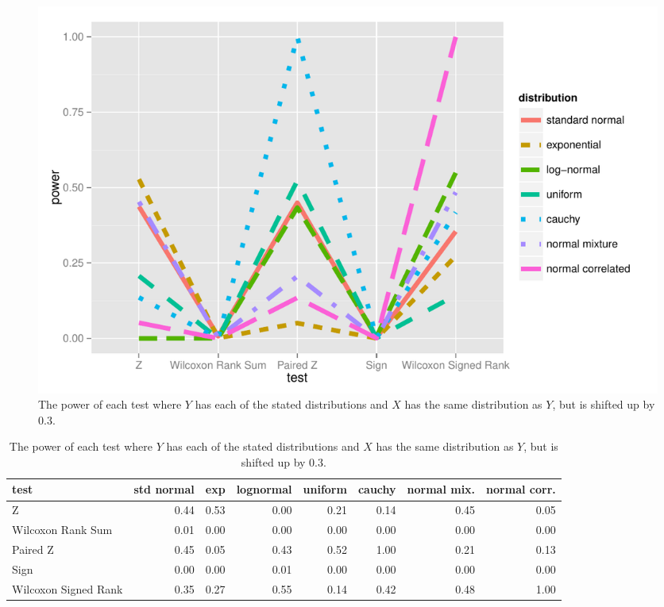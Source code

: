 \documentclass[11pt]{article}
\begin{document}
\begin{figure}[H]
\centering
\includegraphics[scale = 0.8]{part2.pdf}
\caption{The power of each test where $Y$ has each of the stated distributions and $X$ has the same distribution as $Y$, but is shifted up by 0.3.}
\label{fig:part2}
\end{figure}


\begin{table}[ht]
\centering
\begin{tabular}{lrrrrrrr}
  \hline
 test & std normal & exp & lognormal & uniform & cauchy & normal mix. & normal corr. \\ 
  \hline
Z & 0.44 & 0.53 & 0.00 & 0.21 & 0.14 & 0.45 & 0.05 \\ 
 Wilcoxon Rank Sum & 0.01 & 0.00 & 0.00 & 0.00 & 0.00 & 0.00 & 0.00 \\ 
 Paired Z & 0.45 & 0.05 & 0.43 & 0.52 & 1.00 & 0.21 & 0.13 \\ 
  Sign & 0.00 & 0.00 & 0.01 & 0.00 & 0.00 & 0.00 & 0.00 \\ 
 Wilcoxon Signed Rank & 0.35 & 0.27 & 0.55 & 0.14 & 0.42 & 0.48 & 1.00 \\ 
   \hline
\end{tabular}
\caption{The power of each test where $Y$ has each of the stated distributions and $X$ has the same distribution as $Y$, but is shifted up by 0.3.}
\label{tab:part2}
\end{table}
\end{document}
